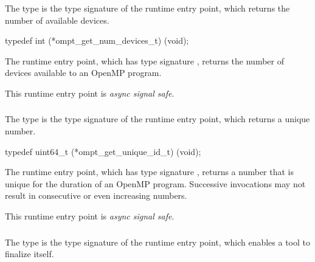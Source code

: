 \summary
The  type is the type signature of the 
 runtime entry point, which returns the
number of available devices.

\format
\begin{ccppspecific}
\begin{omptInquiry}
typedef int (*ompt_get_num_devices_t) (void);
\end{omptInquiry}
\end{ccppspecific}

\descr
The  runtime entry point, which has 
type signature , returns the number 
of devices available to an OpenMP program.

This runtime entry point is \emph{async signal safe}.



\subsubsection{}
\label{sec:ompt_get_unique_id_t}
\label{sec:ompt_get_unique_id}

\summary
The  type is the type signature of the 
 runtime entry point, which returns a unique number.

\format
\begin{ccppspecific}
\begin{omptInquiry}
typedef uint64_t (*ompt_get_unique_id_t) (void);
\end{omptInquiry}
\end{ccppspecific}

\descr
The  runtime entry point, which has type 
signature , returns a number that is unique 
for the duration of an OpenMP program. Successive invocations may not 
result in consecutive or even increasing numbers.

This runtime entry point is \emph{async signal safe}.



\subsubsection{}
\label{sec:ompt_finalize_tool_t}
\label{sec:ompt_finalize_tool}

\summary
The  type is the type signature of the 
 runtime entry point, which enables a tool 
to finalize itself.

